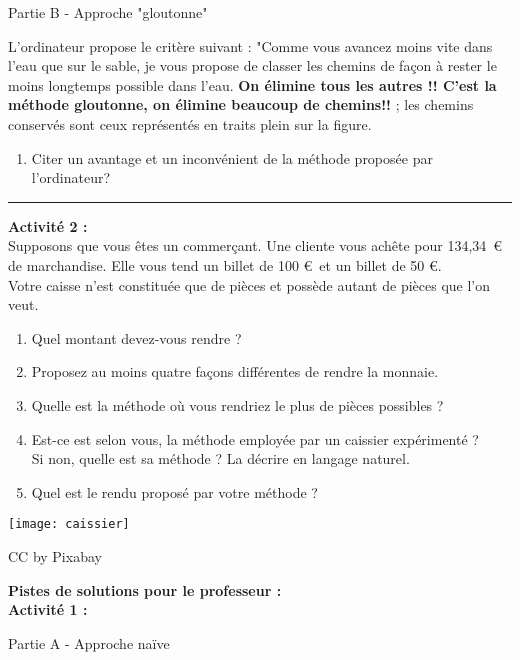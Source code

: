 \documentclass[12pt,french]{article}
\begin{document}
\begin{center}
	Partie B - Approche "gloutonne"
\end{center}
	L'ordinateur propose le critère suivant : "Comme vous avancez moins vite dans l'eau que sur le sable, je vous propose de classer les chemins de façon à rester le moins longtemps possible dans l'eau. \textbf{ On élimine tous les autres !! C'est la méthode gloutonne, on élimine beaucoup de chemins!!} ;  les chemins conservés sont ceux représentés en traits plein sur la figure.
	\begin{enumerate}
	\item Citer un avantage et un inconvénient de la méthode proposée par l'ordinateur?
\end{enumerate}

\hrule
\medskip 
\begin{minipage}{0.75\linewidth}
\large{\textbf{Activité 2 :}}
\normalsize\\
Supposons que vous êtes un commerçant. Une cliente vous achête pour 134,34\, \euro\, de marchandise. Elle vous tend un billet de 100 \euro\, et un billet de 50 \euro.\\
Votre caisse n'est constituée que de pièces et possède autant de pièces que l'on veut. 
\begin{enumerate}
	\item Quel montant devez-vous rendre ? 
	\item Proposez au moins quatre façons différentes de rendre la monnaie.
	\item Quelle est la méthode où vous rendriez le plus de pièces possibles ?
	\item Est-ce est selon vous, la méthode employée par un caissier expérimenté ? \\
	Si non, quelle est sa méthode ? La décrire en langage naturel.
	\item Quel est le rendu proposé par votre méthode ?
\end{enumerate}
\end{minipage}
\begin{minipage}{0.25\linewidth}
\texttt{[image: caissier]}\\
\begin{flushright}
	CC by Pixabay
\end{flushright}
\end{minipage}
\newpage
\textbf{Pistes de solutions pour le professeur :}\\
\textbf{Activité 1 :}\\
\begin{center}
	Partie A - Approche naïve
\end{center}
\end{document}
